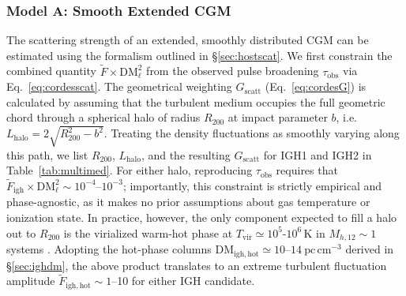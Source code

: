 \documentclass[twocolumn, linenumbers, tra]{aastex631}
\newcommand{\rev}[1]{{\color{purple}#1}}
\begin{document}
\subsubsection{\texorpdfstring{Model A: \rev{Smooth} Extended CGM}{}}\label{sec:extmed}

\rev{The scattering strength of an extended, smoothly distributed CGM can be estimated using the formalism outlined in \S\ref{sec:hostscat}. We first constrain the combined quantity $\widetilde{F}\times\mathrm{DM}_{\ell}^{2}$ from the observed pulse broadening $\tau_{\mathrm{obs}}$ via Eq.~\ref{eq:cordesscat}. The geometrical weighting $G_{\mathrm{scatt}}$ (Eq.~\ref{eq:cordesG}) is calculated by assuming that the turbulent medium occupies the full geometric chord through a spherical halo of radius $R_{200}$ at impact parameter $b$, i.e.\ $L_{\mathrm{halo}} = 2\sqrt{R_{200}^{2}-b^{2}}$. Treating the density fluctuations as smoothly varying along this path, we list $R_{200}$, $L_{\mathrm{halo}}$, and the resulting $G_{\mathrm{scatt}}$ for IGH1 and IGH2 in Table~\ref{tab:multimed}. For either halo, reproducing $\tau_{\mathrm{obs}}$ requires that $\widetilde{F}_{\mathrm{igh}}\times\mathrm{DM}_{\ell}^{2} \sim 10^{-4}$--$10^{-3}$; importantly, this constraint is strictly empirical and phase-agnostic, as it makes no prior assumptions about gas temperature or ionization state. In practice, however, the only component expected to fill a halo out to $R_{200}$ is the virialized warm-hot phase at $T_{\mathrm{vir}} \simeq 10^{5}$-$10^{6}\,$K in $M_{h,12} \sim 1$ systems \citep{Tumlinson2017,Qu2018}. Adopting the hot-phase columns $\mathrm{DM}_{\mathrm{igh, hot}} \simeq 10$--$14\ \mathrm{pc\,cm^{-3}}$ derived in \S\ref{sec:ighdm}, the above product translates to an extreme turbulent fluctuation amplitude $\widetilde{F}_{\mathrm{igh, hot}} \sim 1$--10 for either IGH candidate. 

}
\end{document}
